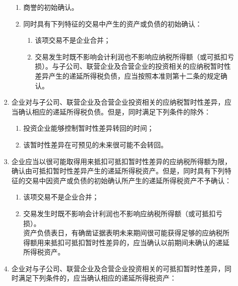 \begin{appendices}
\begin{enumerate}[itemsep=0pt, leftmargin=1cm, before=\normalfont\small]
\begin{enumerate}[itemsep=0pt, leftmargin=1cm, before=\normalfont\small, start=10]
\begin{enumerate}[itemsep=0pt, leftmargin=1cm, before=\normalfont\small, start=1]
                            \item 商誉的初始确认。
                            \item 同时具有下列特征的交易中产生的资产或负债的初始确认：
                                  \begin{enumerate}[itemsep=0pt, leftmargin=1cm, before=\normalfont\small, start=1] %
                                      \item 该项交易不是企业合并；
                                      \item 交易发生时既不影响会计利润也不影响应纳税所得额（或可抵扣亏损）。与子公司、联营企业及合营企业的投资相关的应纳税暂时性差异产生的递延所得税负债，应当按照本准则第十二条的规定确认。
                                  \end{enumerate}
                        \end{enumerate}
                  \item 企业对与子公司、联营企业及合营企业投资相关的应纳税暂时性差异，应当确认相应的递延所得税负债。但是，同时满足下列条件的除外：
                        \begin{enumerate}[itemsep=0pt, leftmargin=1cm, before=\normalfont\small, start=1] %
                            \item 投资企业能够控制暂时性差异转回的时间；
                            \item 该暂时性差异在可预见的未来很可能不会转回。
                        \end{enumerate}
                  \item 企业应当以很可能取得用来抵扣可抵扣暂时性差异的应纳税所得额为限，确认由可抵扣暂时性差异产生的递延所得税资产。但是，同时具有下列特征的交易中因资产或负债的初始确认所产生的递延所得税资产不予确认：
                        \begin{enumerate}[itemsep=0pt, leftmargin=1cm, before=\normalfont\small, start=1] %
                            \item 该项交易不是企业合并；
                            \item 交易发生时既不影响会计利润也不影响应纳税所得额（或可抵扣亏损）。\\资产负债表日，有确凿证据表明未来期间很可能获得足够的应纳税所得额用来抵扣可抵扣暂时性差异的，应当确认以前期间未确认的递延所得税资产。
                        \end{enumerate}
                  \item 企业对与子公司、联营企业及合营企业投资相关的可抵扣暂时性差异，同时满足下列条件的，应当确认相应的递延所得税资产：

\end{enumerate}
\end{enumerate}
\end{appendices}

